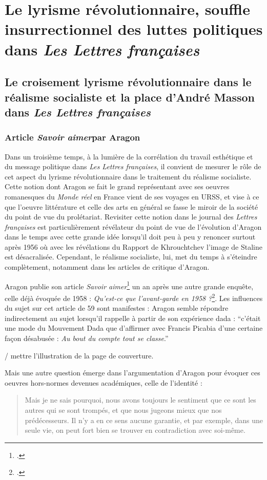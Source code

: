\chapter{Le lyrisme révolutionnaire, souffle insurrectionnel des luttes politiques dans \emph{Les Lettres françaises} }

\section{Le croisement lyrisme révolutionnaire dans le réalisme socialiste et la place d’André Masson dans \emph{Les Lettres françaises}}

\subsection{Article \emph{Savoir aimer}par Aragon}

Dans un troisième temps, à la lumière de la corrélation du travail esthétique et du message politique dans \emph{Les Lettres françaises}, il convient de mesurer le rôle de cet aspect du lyrisme révolutionnaire dans le traitement du réalisme socialiste. Cette notion dont Aragon se fait le grand représentant avec ses oeuvres romanesques du \emph{Monde réel} en France vient de ses voyages en URSS, et vise à ce que l’oeuvre littérature et celle des arts en général se fasse le miroir de la société du point de vue du prolétariat. Revisiter cette notion dans le journal des \emph{Lettres françaises} est particulièrement révélateur du point de vue de l’évolution d’Aragon dans le temps avec cette grande idée lorsqu’il doit peu à peu y renoncer surtout après 1956 où avec les révélations du Rapport de Khrouchtchev l’image de Staline est désacralisée. Cependant, le réalisme socialiste, lui, met du temps à s’éteindre complètement, notamment dans les articles de critique d’Aragon. 

	 Aragon publie son article \emph{Savoir aimer}\footcite{savoiraimer} un an après une autre grande enquête, celle déjà évoquée de 1958 : \emph{Qu’est-ce que l’avant-garde en 1958 ?}\footcite{avantgarde}. Les influences du sujet sur cet article de 59 sont manifestes : Aragon semble répondre indirectement au sujet lorsqu’il rappelle à partir de son expérience dada : \enquote{c’était une mode du Mouvement Dada que d’affirmer avec Francis Picabia d’une certaine façon désabusée : \emph{Au bout du compte tout se classe}.}

 / mettre l'illustration de la page de couverture. 

 Mais une autre question émerge dans l’argumentation d’Aragon pour évoquer ces oeuvres hors-normes devenues académiques, celle de l’identité :  
 \begin{quote}
  Mais je ne sais pourquoi, nous avons toujours le sentiment que ce sont les autres qui se sont trompés, et que nous jugeons mieux que nos prédécesseurs. Il n’y a en ce sens aucune garantie, et par exemple, dans une seule vie, on peut fort bien se trouver en contradiction avec soi-même.    
 \end{quote}

